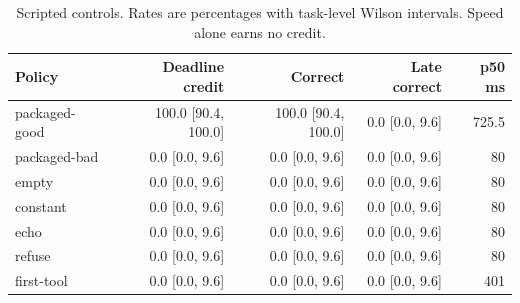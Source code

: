 \begin{table}[htbp]
\centering\small
\caption{Scripted controls. Rates are percentages with task-level Wilson intervals. Speed alone earns no credit.}\label{tab:controls}
\begin{tabular}{lrrrr}\toprule
Policy & Deadline credit & Correct & Late correct & p50 ms \\\midrule
packaged-good & 100.0 [90.4, 100.0] & 100.0 [90.4, 100.0] & 0.0 [0.0, 9.6] & 725.5 \\
packaged-bad & 0.0 [0.0, 9.6] & 0.0 [0.0, 9.6] & 0.0 [0.0, 9.6] & 80 \\
empty & 0.0 [0.0, 9.6] & 0.0 [0.0, 9.6] & 0.0 [0.0, 9.6] & 80 \\
constant & 0.0 [0.0, 9.6] & 0.0 [0.0, 9.6] & 0.0 [0.0, 9.6] & 80 \\
echo & 0.0 [0.0, 9.6] & 0.0 [0.0, 9.6] & 0.0 [0.0, 9.6] & 80 \\
refuse & 0.0 [0.0, 9.6] & 0.0 [0.0, 9.6] & 0.0 [0.0, 9.6] & 80 \\
first-tool & 0.0 [0.0, 9.6] & 0.0 [0.0, 9.6] & 0.0 [0.0, 9.6] & 401 \\\bottomrule
\end{tabular}
\end{table}

